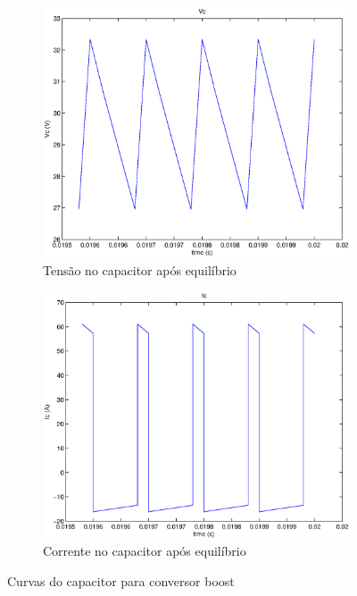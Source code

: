 \documentclass{article}
\begin{document}
\begin{figure}[H]
\begin{subfigure}[b]{0.4\linewidth}
		\includegraphics[width=\linewidth]{matlab/boost/b_vcst}
		\caption{Tensão no capacitor após equilíbrio}
	\end{subfigure}
	\begin{subfigure}[b]{0.4\linewidth}
		\centering
		\includegraphics[width=\linewidth]{matlab/boost/b_icst}
		\caption{Corrente no capacitor após equilíbrio}
	\end{subfigure}
	\caption{Curvas do capacitor para conversor boost}
	\label{fig:boc}
\end{figure}
\end{document}
